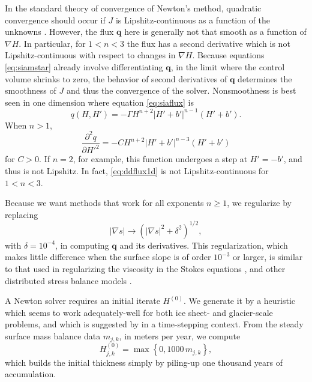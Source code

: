 \documentclass[review,letterpaper]{igs}
\newcommand\bq{\mathbf{q}}
\newcommand{\grad}{\nabla}
\begin{document}
In the standard theory of convergence of Newton's method, quadratic convergence should occur if $J$ is Lipshitz-continuous as a function of the unknowns \citep{Kelley2003}.  However, the flux $\bq$ here is generally not that smooth as a function of $\grad H$.  In particular, for $1<n<3$ the flux has a second derivative which is not Lipshitz-continuous with respect to changes in $\grad H$.  Because equations \eqref{eq:siamstar} already involve differentiating $\bq$, in the limit where the control volume shrinks to zero, the behavior of second derivatives of $\bq$ determines the smoothness of $J$ and thus the convergence of the solver.  Nonsmoothness is best seen in one dimension where equation \eqref{eq:siaflux} is
\begin{equation}
q(H,H') = - \Gamma H^{n+2} \left|H'+b'\right|^{n-1} (H'+b'). \label{eq:flux1d}
\end{equation}
When $n>1$,
\begin{equation}
\frac{\partial^2 q}{\partial H'^2} = - C H^{n+2} \left|H'+b'\right|^{n-3} (H'+b') \label{eq:ddflux1d}
\end{equation}
for $C>0$.  If $n=2$, for example, this function undergoes a step at $H'=-b'$, and thus is not Lipshitz.  In fact, \eqref{eq:ddflux1d} is not Lipshitz-continuous for $1<n<3$.

Because we want methods that work for all exponents $n\ge 1$, we regularize by replacing
\begin{equation}
|\grad s| \to \left(|\grad s|^2 + \delta^2\right)^{1/2}, \label{eq:nonlinregularization}
\end{equation}
with $\delta = 10^{-4}$, in computing $\bq$ and its derivatives.  This regularization, which makes little difference when the surface slope is of order $10^{-3}$ or larger, is similar to that used in regularizing the viscosity in the Stokes equations \citep{GreveBlatter2009}, and other distributed stress balance models \citep[for example]{BrownSmithAhmadia2013,BuelerBrown2009}.

A Newton solver requires an initial iterate $H^{(0)}$.  We generate it by a heuristic which seems to work adequately-well for both ice sheet- and glacier-scale problems, and which is suggested by \cite{JouvetGraeser2013} in a time-stepping context.  From the steady surface mass balance data $m_{j,k}$, in meters per year, we compute
\begin{equation}
H_{j,k}^{(0)} = \max\left\{0,1000\,m_{j,k}\right\},  \label{eq:nonlininitialheuristic}
\end{equation}
which builds the initial thickness simply by piling-up one thousand years of accumulation.
\end{document}
